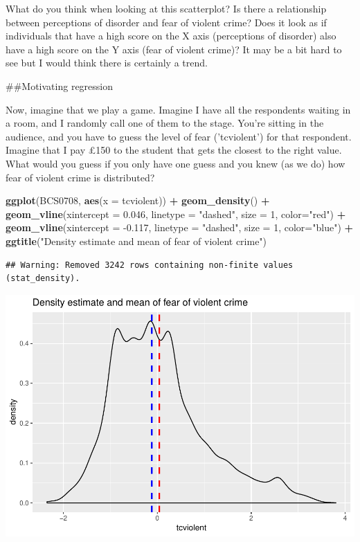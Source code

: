 \documentclass[]{book}
\newenvironment{Shaded}{\begin{snugshade}}{\end{snugshade}}
\newcommand{\DataTypeTok}[1]{\textcolor[rgb]{0.13,0.29,0.53}{#1}}
\newcommand{\DecValTok}[1]{\textcolor[rgb]{0.00,0.00,0.81}{#1}}
\newcommand{\FloatTok}[1]{\textcolor[rgb]{0.00,0.00,0.81}{#1}}
\newcommand{\KeywordTok}[1]{\textcolor[rgb]{0.13,0.29,0.53}{\textbf{#1}}}
\newcommand{\NormalTok}[1]{#1}
\newcommand{\OperatorTok}[1]{\textcolor[rgb]{0.81,0.36,0.00}{\textbf{#1}}}
\newcommand{\StringTok}[1]{\textcolor[rgb]{0.31,0.60,0.02}{#1}}
\theoremstyle{definition}
\theoremstyle{definition}
\theoremstyle{definition}
\theoremstyle{remark}
\begin{document}
What do you think when looking at this scatterplot? Is there a
relationship between perceptions of disorder and fear of violent crime?
Does it look as if individuals that have a high score on the X axis
(perceptions of disorder) also have a high score on the Y axis (fear of
violent crime)? It may be a bit hard to see but I would think there is
certainly a trend.

\#\#Motivating regression

Now, imagine that we play a game. Imagine I have all the respondents
waiting in a room, and I randomly call one of them to the stage. You're
sitting in the audience, and you have to guess the level of fear
('tcviolent') for that respondent. Imagine that I pay £150 to the
student that gets the closest to the right value. What would you guess
if you only have one guess and you knew (as we do) how fear of violent
crime is distributed?

\begin{Shaded}
\begin{Highlighting}[]
\KeywordTok{ggplot}\NormalTok{(BCS0708, }\KeywordTok{aes}\NormalTok{(}\DataTypeTok{x =}\NormalTok{ tcviolent)) }\OperatorTok{+}\StringTok{ }
\StringTok{  }\KeywordTok{geom_density}\NormalTok{() }\OperatorTok{+}
\StringTok{  }\KeywordTok{geom_vline}\NormalTok{(}\DataTypeTok{xintercept =} \FloatTok{0.046}\NormalTok{, }\DataTypeTok{linetype =} \StringTok{"dashed"}\NormalTok{, }\DataTypeTok{size =} \DecValTok{1}\NormalTok{, }\DataTypeTok{color=}\StringTok{"red"}\NormalTok{) }\OperatorTok{+}
\StringTok{  }\KeywordTok{geom_vline}\NormalTok{(}\DataTypeTok{xintercept =} \FloatTok{-0.117}\NormalTok{, }\DataTypeTok{linetype =} \StringTok{"dashed"}\NormalTok{, }\DataTypeTok{size =} \DecValTok{1}\NormalTok{, }\DataTypeTok{color=}\StringTok{"blue"}\NormalTok{) }\OperatorTok{+}
\StringTok{  }\KeywordTok{ggtitle}\NormalTok{(}\StringTok{"Density estimate and mean of fear of violent crime"}\NormalTok{)}
\end{Highlighting}
\end{Shaded}

\begin{verbatim}
## Warning: Removed 3242 rows containing non-finite values (stat_density).
\end{verbatim}

\includegraphics{08-regression_files/figure-latex/unnamed-chunk-4-1.pdf}
\end{document}
